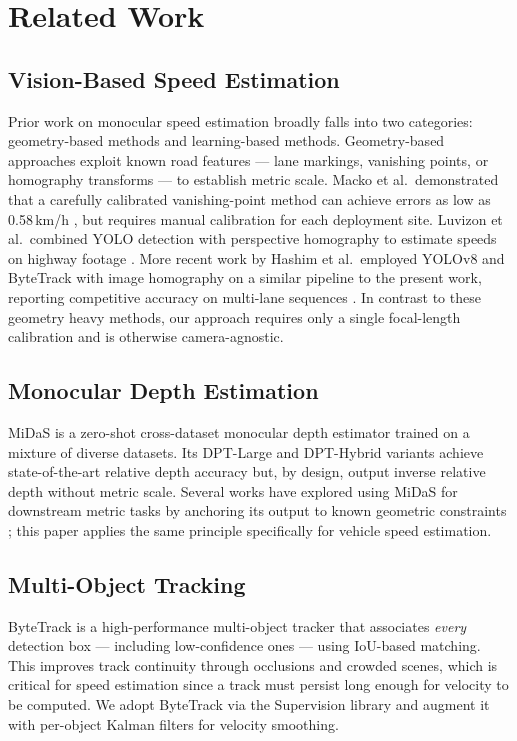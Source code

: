 \documentclass[conference]{IEEEtran}
\begin{document}
\section{Related Work}

\subsection{Vision-Based Speed Estimation}
Prior work on monocular speed estimation broadly falls into two
categories: geometry-based methods and learning-based methods.
Geometry-based approaches exploit known road features --- lane
markings, vanishing points, or homography transforms --- to
establish metric scale. Macko et al.\ demonstrated that a
carefully calibrated vanishing-point method can achieve errors
as low as 0.58\,km/h \cite{macko2020speed}, but requires
manual calibration for each deployment site. Luvizon et al.\
combined YOLO detection with perspective homography to estimate
speeds on highway footage \cite{luvizon2017speed}. More recent
work by Hashim et al.\ employed YOLOv8 and ByteTrack with
image homography on a similar pipeline to the present work,
reporting competitive accuracy on multi-lane sequences
\cite{hashim2024homography}. In contrast to these geometry
heavy methods, our approach requires only a single focal-length
calibration and is otherwise camera-agnostic.

\subsection{Monocular Depth Estimation}
MiDaS \cite{ranftl2022midas} is a zero-shot cross-dataset
monocular depth estimator trained on a mixture of diverse
datasets. Its DPT-Large and DPT-Hybrid variants achieve
state-of-the-art relative depth accuracy but, by design,
output inverse relative depth without metric scale. Several
works have explored using MiDaS for downstream metric tasks
by anchoring its output to known geometric constraints
\cite{ranftl2022midas}; this paper applies the same principle
specifically for vehicle speed estimation.

\subsection{Multi-Object Tracking}
ByteTrack \cite{zhang2022bytetrack} is a high-performance
multi-object tracker that associates \emph{every} detection
box --- including low-confidence ones --- using IoU-based
matching. This improves track continuity through occlusions
and crowded scenes, which is critical for speed estimation
since a track must persist long enough for velocity to be
computed. We adopt ByteTrack via the Supervision library
\cite{sv2023} and augment it with per-object Kalman filters
for velocity smoothing.
\end{document}
